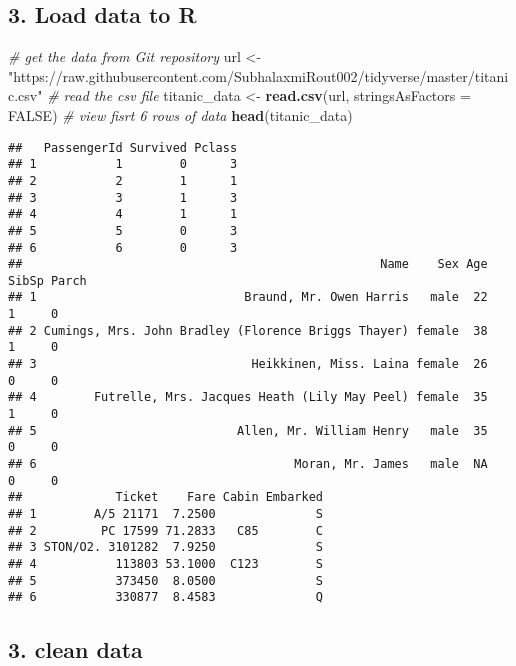 \documentclass[
]{article}
\newenvironment{Shaded}{\begin{snugshade}}{\end{snugshade}}
\newcommand{\CommentTok}[1]{\textcolor[rgb]{0.56,0.35,0.01}{\textit{#1}}}
\newcommand{\DataTypeTok}[1]{\textcolor[rgb]{0.13,0.29,0.53}{#1}}
\newcommand{\KeywordTok}[1]{\textcolor[rgb]{0.13,0.29,0.53}{\textbf{#1}}}
\newcommand{\NormalTok}[1]{#1}
\newcommand{\OtherTok}[1]{\textcolor[rgb]{0.56,0.35,0.01}{#1}}
\newcommand{\StringTok}[1]{\textcolor[rgb]{0.31,0.60,0.02}{#1}}
\begin{document}
\hypertarget{load-data-to-r}{%
\subsection{3. Load data to R}\label{load-data-to-r}}

\begin{Shaded}
\begin{Highlighting}[]
\CommentTok{# get the data from Git repository}
\NormalTok{url <-}\StringTok{ "https://raw.githubusercontent.com/SubhalaxmiRout002/tidyverse/master/titanic.csv"}
\CommentTok{# read the csv file}
\NormalTok{titanic_data <-}\StringTok{ }\KeywordTok{read.csv}\NormalTok{(url, }\DataTypeTok{stringsAsFactors =} \OtherTok{FALSE}\NormalTok{)}
\CommentTok{# view fisrt 6 rows of data}
\KeywordTok{head}\NormalTok{(titanic_data)}
\end{Highlighting}
\end{Shaded}

\begin{verbatim}
##   PassengerId Survived Pclass
## 1           1        0      3
## 2           2        1      1
## 3           3        1      3
## 4           4        1      1
## 5           5        0      3
## 6           6        0      3
##                                                  Name    Sex Age SibSp Parch
## 1                             Braund, Mr. Owen Harris   male  22     1     0
## 2 Cumings, Mrs. John Bradley (Florence Briggs Thayer) female  38     1     0
## 3                              Heikkinen, Miss. Laina female  26     0     0
## 4        Futrelle, Mrs. Jacques Heath (Lily May Peel) female  35     1     0
## 5                            Allen, Mr. William Henry   male  35     0     0
## 6                                    Moran, Mr. James   male  NA     0     0
##             Ticket    Fare Cabin Embarked
## 1        A/5 21171  7.2500              S
## 2         PC 17599 71.2833   C85        C
## 3 STON/O2. 3101282  7.9250              S
## 4           113803 53.1000  C123        S
## 5           373450  8.0500              S
## 6           330877  8.4583              Q
\end{verbatim}

\hypertarget{clean-data}{%
\subsection{3. clean data}\label{clean-data}}
\end{document}
